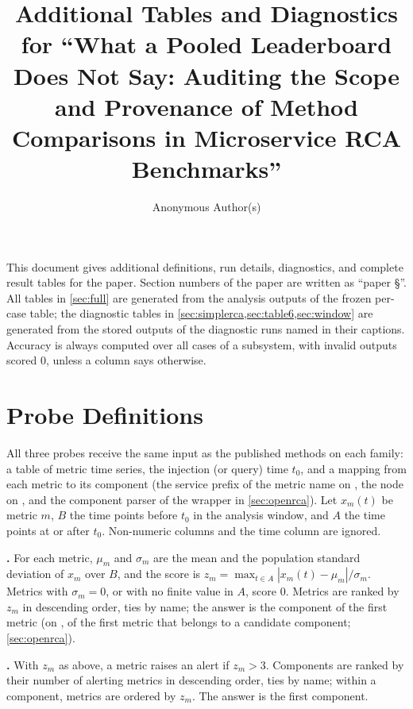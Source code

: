 \documentclass[10pt]{article}
\begin{document}
\title{Additional Tables and Diagnostics for ``What a Pooled Leaderboard Does Not Say: Auditing the Scope and Provenance of Method Comparisons in Microservice RCA Benchmarks''}
\author{Anonymous Author(s)}
\date{}
\maketitle

This document gives additional definitions, run details, diagnostics, and complete result tables for the paper.
Section numbers of the paper are written as ``paper \S''.
All tables in \cref{sec:full} are generated from the analysis outputs of the frozen per-case table; the diagnostic tables in \cref{sec:simplerca,sec:table6,sec:window} are generated from the stored outputs of the diagnostic runs named in their captions.
Accuracy is always computed over all cases of a subsystem, with invalid outputs scored 0, unless a column says otherwise.

\section{Probe Definitions}
\label{sec:probes}

All three probes receive the same input as the published methods on each family: a table of metric time series, the injection (or query) time $t_0$, and a mapping from each metric to its component (the service prefix of the metric name on \rcaeval, the node on \petshop, and the component parser of the \openrca wrapper in \cref{sec:openrca}).
Let $x_m(t)$ be metric $m$, $B$ the time points before $t_0$ in the analysis window, and $A$ the time points at or after $t_0$.
Non-numeric columns and the time column are ignored.

\textbf{\maxz.}
For each metric, $\mu_m$ and $\sigma_m$ are the mean and the population standard deviation of $x_m$ over $B$, and the score is $z_m = \max_{t\in A} |x_m(t)-\mu_m|/\sigma_m$.
Metrics with $\sigma_m = 0$, or with no finite value in $A$, score 0.
Metrics are ranked by $z_m$ in descending order, ties by name; the answer is the component of the first metric (on \openrca, of the first metric that belongs to a candidate component; \cref{sec:openrca}).

\textbf{\alertcount.}
With $z_m$ as above, a metric raises an alert if $z_m > 3$.
Components are ranked by their number of alerting metrics in descending order, ties by name; within a component, metrics are ordered by $z_m$.
The answer is the first component.
\end{document}
